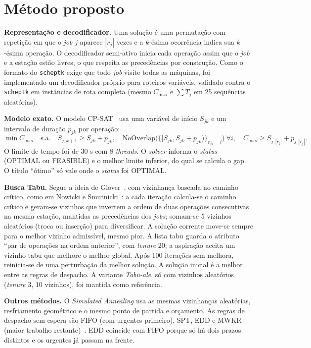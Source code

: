 \section{Método proposto}

\textbf{Representação e decodificador.} Uma solução é uma permutação com repetição em que o \textit{job} $j$ aparece $|r_j|$ vezes e a $k$-ésima ocorrência indica sua $k$-ésima operação. O decodificador semi-ativo inicia cada operação assim que o \textit{job} e a estação estão livres, o que respeita as precedências por construção. Como o formato do \texttt{scheptk} exige que todo \textit{job} visite todas as máquinas, foi implementado um decodificador próprio para roteiros variáveis, validado contra o \texttt{scheptk} em instâncias de rota completa (mesmo $C_{\max}$ e $\sum T_j$ em 25 sequências aleatórias).

\textbf{Modelo exato.} O modelo CP-SAT~\cite{ortools} usa uma variável de início $S_{jk}$ e um intervalo de duração $p_{jk}$ por operação:
\begin{equation}\label{eq:cpsat}
    \min C_{\max} \quad \text{s.a.} \quad S_{j,k+1} \ge S_{jk} + p_{jk}, \quad \text{NoOverlap}\big(\{[S_{jk}, S_{jk}+p_{jk})\}_{r_{jk}=i}\big)\ \forall i, \quad C_{\max} \ge S_{j,|r_j|}+p_{j,|r_j|}.
\end{equation}
O limite de tempo foi de 30 s com 8 \textit{threads}. O \textit{solver} informa o \textit{status} (OPTIMAL ou FEASIBLE) e o melhor limite inferior, do qual se calcula o gap. O título ``ótimo'' só vale onde o \textit{status} foi OPTIMAL.

\textbf{Busca Tabu.} Segue a ideia de Glover~\cite{glover1989tabu1,glover1990tabu2}, com vizinhança baseada no caminho crítico, como em Nowicki e Smutnicki~\cite{nowicki1996fast}: a cada iteração calcula-se o caminho crítico e geram-se vizinhos que invertem a ordem de duas operações consecutivas na mesma estação, mantidas as precedências dos \textit{jobs}; somam-se 5 vizinhos aleatórios (troca ou inserção) para diversificar. A solução corrente move-se sempre para o melhor vizinho admissível, mesmo pior. A lista tabu guarda o atributo ``par de operações na ordem anterior'', com \textit{tenure} 20; a aspiração aceita um vizinho tabu que melhore o melhor global. Após 100 iterações sem melhora, reinicia-se de uma perturbação da melhor solução. A solução inicial é a melhor entre as regras de despacho. A variante \textit{Tabu-ale}, só com vizinhos aleatórios (\textit{tenure} 3, 10 vizinhos), foi mantida como referência.

\textbf{Outros métodos.} O \textit{Simulated Annealing} usa as mesmas vizinhanças aleatórias, resfriamento geométrico e o mesmo ponto de partida e orçamento. As regras de despacho sem espera são FIFO (com urgentes primeiro), SPT, EDD e MWKR (maior trabalho restante)~\cite{pinedo2016scheduling}. EDD coincide com FIFO porque só há dois prazos distintos e os urgentes já passam na frente.

